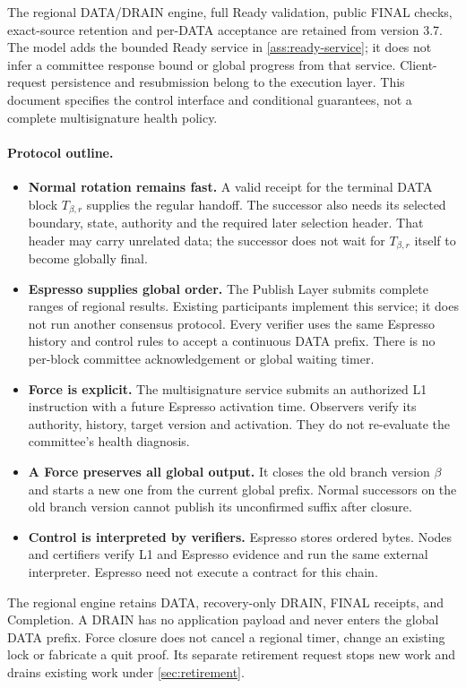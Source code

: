 \documentclass[11pt,a4paper]{article}
\newcounter{protocol}
\begin{document}
The regional DATA/DRAIN engine, full Ready validation, public FINAL
checks, exact-source retention and per-DATA acceptance are retained
from version 3.7. The model adds the bounded Ready service in
\cref{ass:ready-service}; it does not infer a committee response bound
or global progress from that service. Client-request persistence and
resubmission belong to the execution layer. This document specifies
the control interface and conditional guarantees, not a complete
multisignature health policy.

\paragraph{Protocol outline.}
\begin{itemize}
\item \textbf{Normal rotation remains fast.} A valid receipt for the
terminal DATA block $T_{\beta,r}$ supplies the regular handoff. The
successor also needs its selected boundary, state, authority and the
required later selection header. That header may carry unrelated data;
the successor does not wait for $T_{\beta,r}$ itself to become globally final.
\item \textbf{Espresso supplies global order.} The Publish Layer submits
complete ranges of regional results. Existing participants implement this
service; it does not run another consensus protocol. Every verifier uses the same
Espresso history and control rules to accept a continuous DATA prefix.
There is no per-block committee acknowledgement or global waiting timer.
\item \textbf{Force is explicit.} The multisignature service submits an
authorized L1 instruction with a future Espresso activation time.
Observers verify its authority, history, target version and activation.
They do not re-evaluate the committee's health diagnosis.
\item \textbf{A Force preserves all global output.} It closes the old
branch version $\beta$ and starts a new one from the current
global prefix. Normal successors on the old branch version cannot publish its
unconfirmed suffix after closure.
\item \textbf{Control is interpreted by verifiers.} Espresso stores
ordered bytes. Nodes and certifiers verify L1 and Espresso evidence and
run the same external interpreter. Espresso need not execute a contract
for this chain.
\end{itemize}

The regional engine retains DATA, recovery-only DRAIN, FINAL receipts,
and Completion. A DRAIN has no application payload and never enters the
global DATA prefix. Force closure does not cancel a regional timer,
change an existing lock or fabricate a quit proof. Its separate retirement
request stops new work and drains existing work under \cref{sec:retirement}.
\end{document}
